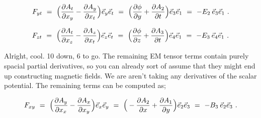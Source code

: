 \documentclass{article}
\begin{document}
\begin{equation} \label{eq:1002}
F_{y t} \hspace{0.125cm} = \hspace{0.125cm}  \Big( \frac{\partial{A_{t}}}{\partial{x_{y}}} - \frac{\partial{A_{y}}}{\partial{x_{t}}} \Big) \vec{e}_{y} \vec{e}_{t} \hspace{0.125cm} = \hspace{0.125cm} \Big(  \frac{\partial{\phi}}{\partial{y}} + \frac{\partial{A_{2}}}{\partial{t}} \Big) \vec{e}_{3} \vec{e}_{1} \hspace{0.125cm} = \hspace{0.125cm} - E_2 \hspace{0.075cm} \vec{e}_{3} \vec{e}_{1} \hspace{0.125cm} .
\end{equation}

\begin{equation} \label{eq:1002}
F_{z t} \hspace{0.125cm} = \hspace{0.125cm}  \Big( \frac{\partial{A_{t}}}{\partial{x_{z}}} - \frac{\partial{A_{z}}}{\partial{x_{t}}} \Big) \vec{e}_{z} \vec{e}_{t} \hspace{0.125cm} = \hspace{0.125cm} \Big( \frac{\partial{\phi}}{\partial{z}} + \frac{\partial{A_{3}}}{\partial{t}} \Big) \vec{e}_{4} \vec{e}_{1} \hspace{0.125cm} = \hspace{0.125cm} - E_3 \hspace{0.075cm} \vec{e}_{4} \vec{e}_{1} \hspace{0.125cm} .
\end{equation}

Alright, cool. 10 down, 6 to go. The remaining EM tensor terms contain purely spacial partial derivatives, so you can already sort of assume that they might end up constructing magnetic fields. We are aren't taking any derivatives of the scalar potential. The remaining terms can be computed as;

\begin{equation} \label{eq:1002}
F_{x y} \hspace{0.125cm} = \hspace{0.125cm}  \Big( \frac{\partial{A_{y}}}{\partial{x_{x}}} - \frac{\partial{A_{x}}}{\partial{x_{y}}} \Big) \vec{e}_{x} \vec{e}_{y} \hspace{0.125cm} = \hspace{0.125cm} \Big( - \frac{\partial{A_{2}}}{\partial{x}} + \frac{\partial{A_{1}}}{\partial{y}} \Big) \vec{e}_{2} \vec{e}_{3} \hspace{0.125cm} = \hspace{0.125cm} - B_3 \hspace{0.075cm} \vec{e}_{2} \vec{e}_{3} \hspace{0.125cm} .
\end{equation}
\end{document}
